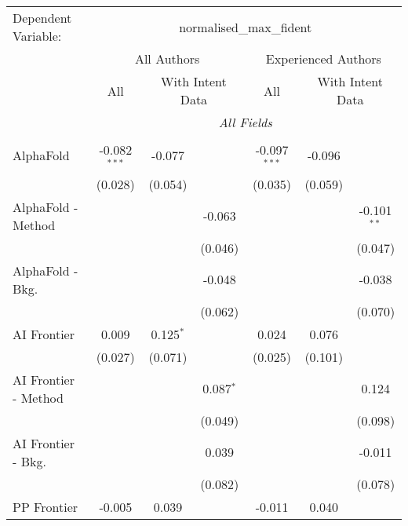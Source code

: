\begingroup
\centering
\begin{tabular}{lcccccc}
   \tabularnewline \midrule \midrule
   Dependent Variable: & \multicolumn{6}{c}{normalised\_max\_fident}\\
 & \multicolumn{3}{c}{All Authors} & \multicolumn{3}{c}{Experienced Authors} \\
\cmidrule(lr){2-4} \cmidrule(lr){5-7}
 & \multicolumn{1}{c}{All} & \multicolumn{2}{c}{With Intent Data} & \multicolumn{1}{c}{All} & \multicolumn{2}{c}{With Intent Data} \\
\cmidrule(lr){2-2} \cmidrule(lr){3-4} \cmidrule(lr){5-5} \cmidrule(lr){6-7}
 & \multicolumn{6}{c}{\textit{All Fields}} \\ \\
   AlphaFold            & -0.082$^{***}$ & -0.077      &               & -0.097$^{***}$ & -0.096  &   \\   
                        & (0.028)        & (0.054)     &               & (0.035)        & (0.059) &   \\   
   AlphaFold - Method   &                &             & -0.063        &                &         & -0.101$^{**}$\\   
                        &                &             & (0.046)       &                &         & (0.047)\\   
   AlphaFold - Bkg.     &                &             & -0.048        &                &         & -0.038\\   
                        &                &             & (0.062)       &                &         & (0.070)\\   
   AI Frontier          & 0.009          & 0.125$^{*}$ &               & 0.024          & 0.076   &   \\   
                        & (0.027)        & (0.071)     &               & (0.025)        & (0.101) &   \\   
   AI Frontier - Method &                &             & 0.087$^{*}$   &                &         & 0.124\\   
                        &                &             & (0.049)       &                &         & (0.098)\\   
   AI Frontier - Bkg.   &                &             & 0.039         &                &         & -0.011\\   
                        &                &             & (0.082)       &                &         & (0.078)\\   
   PP Frontier          & -0.005         & 0.039       &               & -0.011         & 0.040   &   \\   

\end{tabular}

